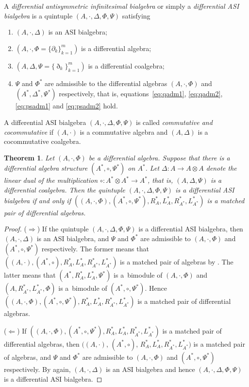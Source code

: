 \documentclass[pdftex]{sigma}
\numberwithin{equation}{section}
\newtheorem{Theorem}{Theorem}[section]
\begin{document}
\begin{Definition}\label{def:dasi}
 A \textit{differential antisymmetric infinitesimal bialgebra} or simply a \textit{differential ASI bialgebra} is a quintuple
 $(A, \cdot, \Delta, \Phi, \Psi)$ satisfying
 \begin{enumerate}\itemsep=0pt
 \item[(1)] $(A, \cdot, \Delta)$ is an ASI bialgebra;
 \item[(2)] $(A, \cdot, \Phi = \{\partial_k\}_{k=1}^m)$ is a differential algebra;
 \item[(3)] $(A, \Delta, \Psi = \{\eth_k\}_{k=1}^m)$ is a differential coalgebra;
 \item[(4)] $\Psi$ and $\Phi^*$ are admissible to the differential algebras $(A, \cdot, \Phi)$ and $(A^*, \Delta^*, \Psi^*)$ respectively, that is,
 equations~\eqref{eq:qadm1}, \eqref{eq:qadm2}, \eqref{eq:psadm1} and \eqref{eq:psadm2} hold.
 \end{enumerate}
 A differential ASI bialgebra $(A, \cdot, \Delta, \Phi, \Psi)$ is called \textit{commutative and cocommutative} if $(A, \cdot)$ is a commutative algebra and $(A, \Delta)$ is a cocommutative coalgebra.
\end{Definition}

\begin{Theorem}\label{thm:asimat}
 Let $(A, \cdot, \Phi)$ be a differential algebra.
 Suppose that there is a differential algebra structure $(A^*, \circ, \Psi^*)$ on $A^*$.
 Let $\Delta\colon A \to A \otimes A$ denote the linear dual of the multiplication $\circ\colon A^* \otimes A^* \to A^*$, that is, $(A, \Delta, \Psi)$ is a differential coalgebra.
 Then the quintuple $(A, \cdot, \Delta, \Phi, \Psi)$ is a differential ASI bialgebra if and only if $((A, \cdot, \Phi), (A^*, \circ, \Psi^*), R^*_A, L^*_A, R^*_{A^*}, L^*_{A^*})$ is a matched pair of differential algebras.
\end{Theorem}
\begin{proof}
 ($\Longrightarrow$)
 If the quintuple $(A, \cdot, \Delta, \Phi, \Psi)$ is a differential ASI bialgebra,
 then $(A, \cdot, \Delta)$ is an ASI bialgebra,
 and $\Psi$ and $\Phi^*$ are admissible to $(A, \cdot, \Phi)$ and $(A^*, \circ, \Psi^*)$ respectively.
 The former means that $((A, \cdot), (A^*, \circ), R^*_A, L^*_A, R^*_{A^*}, L^*_{A^*})$ is a matched pair of algebras by \cite[Theorem~2.2.3]{BaiDouble}.
 The latter means that $(A^*, R^*_A, L^*_A, \Psi^*)$ is a~bimodule of $(A, \cdot, \Phi)$
 and $(A, R^*_{A^*}, L^*_{A^*}, \Phi)$ is a~bimodule of $(A^*, \circ, \Psi^*)$.
 Hence $((A, \cdot, \Phi), (A^*, \circ, \Psi^*), R^*_A, L^*_A, R^*_{A^*}, L^*_{A^*})$ is a matched pair of differential algebras.

 ($\Longleftarrow$)
 If $((A, \cdot, \Phi), (A^*, \circ, \Psi^*), R^*_A, L^*_A, R^*_{A^*}, L^*_{A^*})$ is a matched pair of differential algebras,
 then $((A, \cdot)$, $(A^*, \circ)$, $R^*_A, L^*_A, R^*_{A^*}, L^*_{A^*})$ is a matched pair of algebras,
 and $\Psi$ and $\Phi^*$ are admissible to $(A, \cdot, \Phi)$ and $(A^*, \circ, \Psi^*)$ respectively.
 By \cite[Theorem~2.2.3]{BaiDouble} again, $(A, \cdot, \Delta)$ is an ASI bialgebra and hence $(A, \cdot, \Delta, \Phi, \Psi)$ is a differential ASI bialgebra.
\end{proof}
\end{document}
